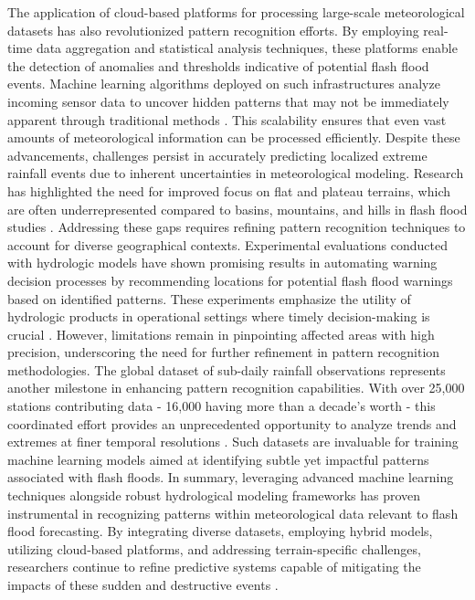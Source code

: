 The application of cloud-based platforms for processing large-scale meteorological datasets has also revolutionized pattern recognition efforts. By employing real-time data aggregation and statistical analysis techniques, these platforms enable the detection of anomalies and thresholds indicative of potential flash flood events. Machine learning algorithms deployed on such infrastructures analyze incoming sensor data to uncover hidden patterns that may not be immediately apparent through traditional methods \citep{Msigwa2024}. This scalability ensures that even vast amounts of meteorological information can be processed efficiently.
Despite these advancements, challenges persist in accurately predicting localized extreme rainfall events due to inherent uncertainties in meteorological modeling. Research has highlighted the need for improved focus on flat and plateau terrains, which are often underrepresented compared to basins, mountains, and hills in flash flood studies \citep{Yang2022}. Addressing these gaps requires refining pattern recognition techniques to account for diverse geographical contexts.
Experimental evaluations conducted with hydrologic models have shown promising results in automating warning decision processes by recommending locations for potential flash flood warnings based on identified patterns. These experiments emphasize the utility of hydrologic products in operational settings where timely decision-making is crucial \citep{Flamig2020}. However, limitations remain in pinpointing affected areas with high precision, underscoring the need for further refinement in pattern recognition methodologies.
The global dataset of sub-daily rainfall observations represents another milestone in enhancing pattern recognition capabilities. With over 25,000 stations contributing data - 16,000 having more than a decade's worth - this coordinated effort provides an unprecedented opportunity to analyze trends and extremes at finer temporal resolutions \citep{Fowler2021}. Such datasets are invaluable for training machine learning models aimed at identifying subtle yet impactful patterns associated with flash floods.
In summary, leveraging advanced machine learning techniques alongside robust hydrological modeling frameworks has proven instrumental in recognizing patterns within meteorological data relevant to flash flood forecasting. By integrating diverse datasets, employing hybrid models, utilizing cloud-based platforms, and addressing terrain-specific challenges, researchers continue to refine predictive systems capable of mitigating the impacts of these sudden and destructive events \citep{Hinge2024}\citep{Msigwa2024}\citep{Ngo2018}\citep{Msigwa2024}.

